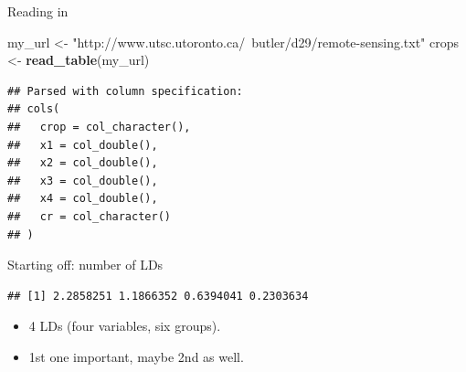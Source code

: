 \documentclass[ignorenonframetext,]{beamer}
\newenvironment{Shaded}{\begin{snugshade}}{\end{snugshade}}
\newcommand{\DataTypeTok}[1]{\textcolor[rgb]{0.13,0.29,0.53}{#1}}
\newcommand{\KeywordTok}[1]{\textcolor[rgb]{0.13,0.29,0.53}{\textbf{#1}}}
\newcommand{\NormalTok}[1]{#1}
\newcommand{\OperatorTok}[1]{\textcolor[rgb]{0.81,0.36,0.00}{\textbf{#1}}}
\newcommand{\StringTok}[1]{\textcolor[rgb]{0.31,0.60,0.02}{#1}}
\begin{document}
\begin{frame}[fragile]{Reading in}
\protect\hypertarget{reading-in-1}{}

\begin{Shaded}
\begin{Highlighting}[]
\NormalTok{my_url <-}\StringTok{ "http://www.utsc.utoronto.ca/~butler/d29/remote-sensing.txt"}
\NormalTok{crops <-}\StringTok{ }\KeywordTok{read_table}\NormalTok{(my_url)}
\end{Highlighting}
\end{Shaded}

\begin{verbatim}
## Parsed with column specification:
## cols(
##   crop = col_character(),
##   x1 = col_double(),
##   x2 = col_double(),
##   x3 = col_double(),
##   x4 = col_double(),
##   cr = col_character()
## )
\end{verbatim}

\end{frame}

\begin{frame}[fragile]{Starting off: number of LDs}
\protect\hypertarget{starting-off-number-of-lds}{}

\begin{Shaded}
\end{Shaded}

\begin{verbatim}
## [1] 2.2858251 1.1866352 0.6394041 0.2303634
\end{verbatim}

\begin{itemize}
\item
  4 LDs (four variables, six groups).
\item
  1st one important, maybe 2nd as well.
\end{itemize}

\end{frame}
\end{document}
